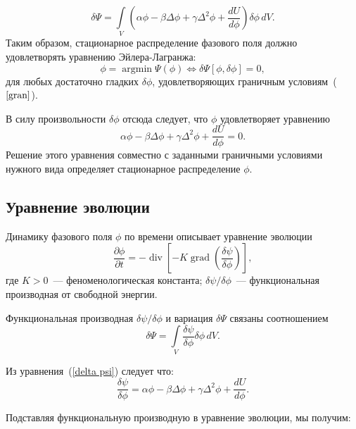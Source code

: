 \begin{equation} \label{delta psi}
    \delta \Psi = \int \limits_V \left( \alpha \phi - \beta \Delta \phi + \gamma \Delta^2 \phi + \frac{dU}{d\phi} \right) \delta \phi \, dV.
\end{equation}
Таким образом, стационарное распределение фазового поля должно удовлетворять уравнению Эйлера-Лагранжа:
\begin{equation*}
    \phi = \operatorname{argmin} \Psi(\phi) \Leftrightarrow \delta \Psi[\phi, \delta \phi] = 0,
\end{equation*}
для любых достаточно гладких $\delta \phi$, удовлетворяющих граничным условиям~($\ref{gran}$).

В силу произвольности $\delta \phi$ отсюда следует, что  $\phi$ удовлетворяет уравнению 
\begin{equation} \label{ravnov_eq}
    \alpha \phi - \beta \Delta \phi + \gamma \Delta^2 \phi + \frac{dU}{d\phi} = 0.
\end{equation}
Решение этого уравнения совместно с заданными граничными условиями нужного вида определяет стационарное распределение $\phi$.


\subsection{Уравнение эволюции}
Динамику фазового поля $\phi$ по времени описывает уравнение эволюции~\cite{chen_2002, elder_2002, elder_2004}
\begin{equation} \label{evolut_eq}
\frac{\partial \phi}{\partial t} = -\operatorname{div}\left[ -K \operatorname{grad}\left(\frac{\delta \psi}{\delta \phi}\right)\right],
\end{equation}
где $K > 0$~--- феноменологическая константа; $\delta \psi / \delta \phi$~--- функциональная производная от свободной энергии.

Функциональная производная \( \delta \psi / \delta \phi \) и вариация \(\delta \Psi\)
связаны соотношением
\[
\delta \Psi = \int \limits_V \frac{\delta \psi}{\delta \phi} \delta \phi \, dV.
\]


Из уравнения~(\ref{delta psi}) следует что:
\[
\frac{\delta \psi}{\delta \phi} =  \alpha \phi - \beta \Delta \phi + \gamma \Delta^2 \phi + \frac{dU}{d\phi} .
\]

Подставляя функциональную производную в уравнение эволюции, мы получим:

